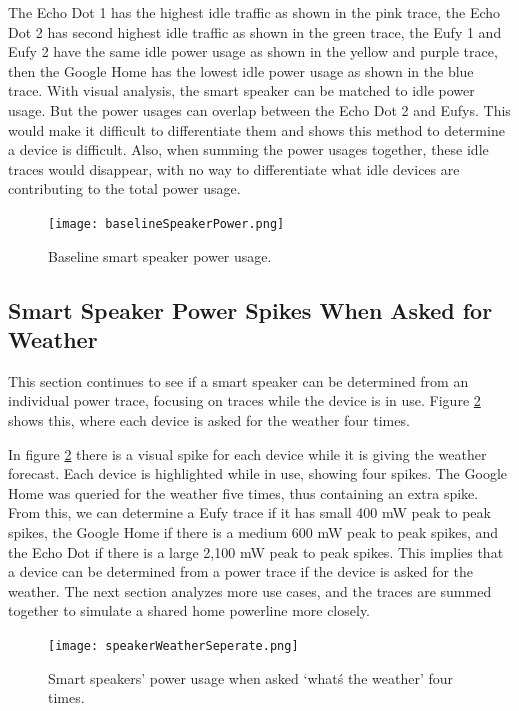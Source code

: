 The Echo Dot 1 has the highest idle traffic as shown in the pink trace, the Echo Dot 2 has second highest idle traffic as shown in the green trace, the Eufy 1 and Eufy 2 have the same idle power usage as shown in the yellow and purple trace, then the Google Home has the lowest idle power usage as shown in the blue trace. With visual analysis, the smart speaker can be matched to idle power usage. But the power usages can overlap between the Echo Dot 2 and Eufys. This would make it difficult to differentiate them and shows this method to determine a device is difficult. Also, when summing the power usages together, these idle traces would disappear, with no way to differentiate what idle devices are contributing to the total power usage.

\begin{figure}[H]
    \centering
    \texttt{[image: baselineSpeakerPower.png]}
    \caption{Baseline smart speaker power usage.}
    \label{fig:baselineSpeakerPower}
\end{figure}

\subsection{Smart Speaker Power Spikes When Asked for Weather}
\label{Smart Speaker Power Spikes When Asked for Weather}
This section continues to see if a smart speaker can be determined from an individual power trace, focusing on traces while the device is in use. Figure \ref{fig:speakerWeatherSeperate}  shows this, where each device is asked for the weather four times.

In figure \ref{fig:speakerWeatherSeperate} there is a visual spike for each device while it is giving the weather forecast. Each device is highlighted while in use, showing four spikes. The Google Home was queried for the weather five times, thus containing an extra spike. From this, we can determine a Eufy trace if it has small 400 mW peak to peak spikes, the Google Home if there is a medium 600 mW peak to peak spikes, and the Echo Dot if there is a large 2,100 mW peak to peak spikes. This implies that a device can be determined from a power trace if the device is asked for the weather. The next section analyzes more use cases, and the traces are summed together to simulate a shared home powerline more closely.

\begin{figure}[H]
    \centering
    \texttt{[image: speakerWeatherSeperate.png]}
    \caption{Smart speakers' power usage when asked `what\'s the weather' four times.}
    \label{fig:speakerWeatherSeperate}
\end{figure}

